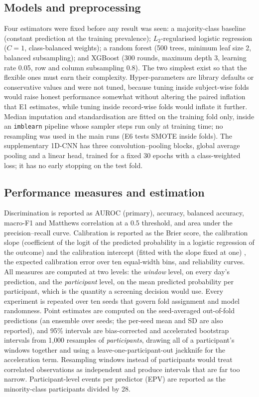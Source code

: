 \documentclass[11pt,a4paper]{article}
\begin{document}
\subsection{Models and preprocessing}
Four estimators were fixed before any result was seen: a majority-class baseline (constant
prediction at the training prevalence); $L_2$-regularised logistic regression ($C=1$, class-balanced
weights); a random forest (500 trees, minimum leaf size 2, balanced subsampling); and XGBoost (300
rounds, maximum depth 3, learning rate 0.05, row and column subsampling 0.8). The two simplest
exist so that the flexible ones must earn their complexity. Hyper-parameters are library defaults
or conservative values and were not tuned, because tuning inside subject-wise folds would raise
honest performance somewhat without altering the paired inflation that E1 estimates, while
tuning inside record-wise folds would inflate it further. Median imputation and standardisation
are fitted on the training fold only, inside an \texttt{imblearn} pipeline whose sampler steps run
only at training time; no resampling was used in the main runs (E6 tests SMOTE inside folds). The
supplementary 1D-CNN has three convolution--pooling blocks, global average pooling and a linear
head, trained for a fixed 30 epochs with a class-weighted loss; it has no early stopping on the
test fold.

\subsection{Performance measures and estimation}
Discrimination is reported as AUROC (primary), accuracy, balanced accuracy, macro-F1 and
Matthews correlation at a 0.5 threshold, and area under the precision--recall curve. Calibration
is reported as the Brier score, the calibration slope (coefficient of the logit of the predicted
probability in a logistic regression of the outcome) and the calibration intercept (fitted with
the slope fixed at one) \cite{vancalster2019}, the expected calibration error over ten equal-width
bins, and reliability curves. All measures are computed at two levels: the \emph{window} level,
on every day's prediction, and the \emph{participant} level, on the mean predicted probability
per participant, which is the quantity a screening decision would use. Every experiment is
repeated over ten seeds that govern fold assignment and model randomness. Point estimates are
computed on the seed-averaged out-of-fold predictions (an ensemble over seeds; the per-seed mean
and SD are also reported), and 95\% intervals are bias-corrected and accelerated bootstrap
intervals from 1{,}000 resamples of \emph{participants}, drawing all of a participant's windows
together and using a leave-one-participant-out jackknife for the acceleration term. Resampling
windows instead of participants would treat correlated observations as independent and produce
intervals that are far too narrow. Participant-level events per predictor (EPV) are reported as
the minority-class participants divided by 28.
\end{document}
